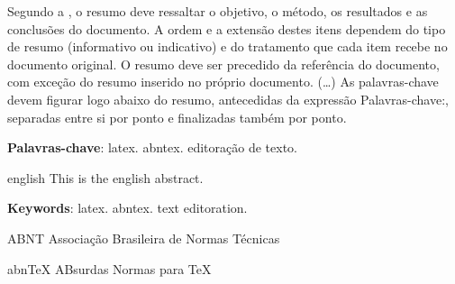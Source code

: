 \documentclass[
	12pt,				%
    oneside,			%
	a4paper,			%
	english,			%
	french,				%
	spanish,			%
	brazil				%
	]{abntex2}
\begin{document}

\setlength{\absparsep}{18pt} %
\begin{resumo}
 Segundo a , o resumo deve ressaltar o
 objetivo, o método, os resultados e as conclusões do documento. A ordem e a extensão
 destes itens dependem do tipo de resumo (informativo ou indicativo) e do
 tratamento que cada item recebe no documento original. O resumo deve ser
 precedido da referência do documento, com exceção do resumo inserido no
 próprio documento. (\ldots) As palavras-chave devem figurar logo abaixo do
 resumo, antecedidas da expressão Palavras-chave:, separadas entre si por
 ponto e finalizadas também por ponto.

 \textbf{Palavras-chave}: latex. abntex. editoração de texto.
\end{resumo}

\begin{resumo}[Abstract]
 \begin{otherlanguage*}{english}
   This is the english abstract.

   \vspace{\onelineskip}

   \noindent
   \textbf{Keywords}: latex. abntex. text editoration.
 \end{otherlanguage*}
\end{resumo}

\listoffigures*
\clearpage

\listoftables*
\clearpage

\begin{siglas}
  \item[ABNT] Associação Brasileira de Normas Técnicas
  \item[abnTeX] ABsurdas Normas para TeX
\end{siglas}

\tableofcontents*
\clearpage

\textual

\end{document}
